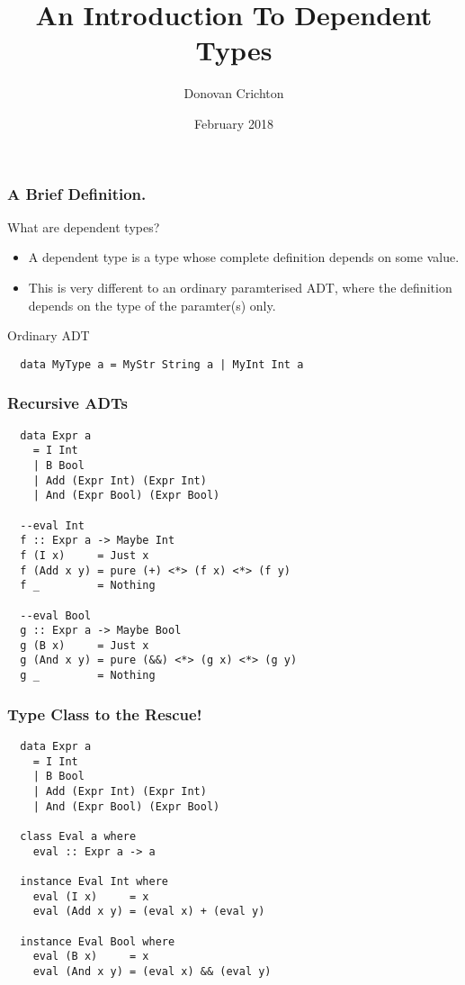 \documentclass{beamer}
\title{An Introduction To Dependent Types}
\author{Donovan Crichton}
\date{February 2018}
\begin{document}
 
\frame{\titlepage}

\begin{frame}[fragile]
  \frametitle{A Brief Definition.}

  \begin{block}{What are dependent types?}
  \begin{itemize}
    \item A dependent type is a type whose complete definition depends on
  some value. 

    \item This is very different to an ordinary paramterised ADT, where the
  definition depends on the \alert{type} of the paramter(s) only.
  \end{itemize}
  \end{block}
  \begin{block}{Ordinary ADT}
  \begin{minipage}{0.5\textwidth}
  \begin{verbatim}
  data MyType a = MyStr String a | MyInt Int a
  \end{verbatim}
  \end{minipage}
  \end{block}
\end{frame}

\begin{frame}[fragile]
\frametitle{Recursive ADTs}
  \begin{minipage}{1\textwidth}
  \begin{verbatim}
  data Expr a
    = I Int 
    | B Bool 
    | Add (Expr Int) (Expr Int) 
    | And (Expr Bool) (Expr Bool)

  --eval Int
  f :: Expr a -> Maybe Int
  f (I x)     = Just x
  f (Add x y) = pure (+) <*> (f x) <*> (f y)
  f _         = Nothing
 
  --eval Bool
  g :: Expr a -> Maybe Bool
  g (B x)     = Just x
  g (And x y) = pure (&&) <*> (g x) <*> (g y)
  g _         = Nothing
  \end{verbatim}
  \end{minipage}
\end{frame}

\begin{frame}[fragile]
\frametitle{Type Class to the Rescue!}
\begin{minipage}{1\textwidth}
\begin{verbatim}
  data Expr a
    = I Int 
    | B Bool 
    | Add (Expr Int) (Expr Int) 
    | And (Expr Bool) (Expr Bool)

  class Eval a where
    eval :: Expr a -> a

  instance Eval Int where
    eval (I x)     = x
    eval (Add x y) = (eval x) + (eval y)

  instance Eval Bool where
    eval (B x)     = x
    eval (And x y) = (eval x) && (eval y)
\end{verbatim}
\end{minipage}
\end{frame}
\end{document}
